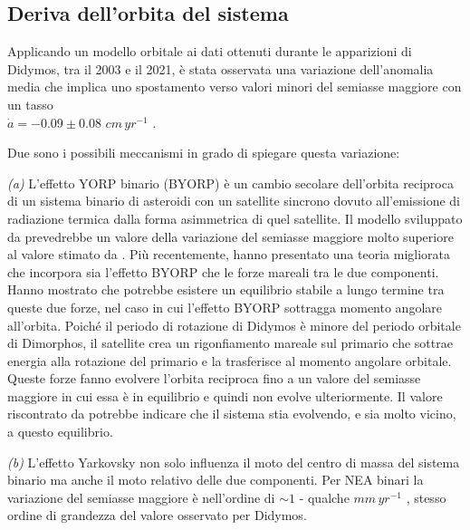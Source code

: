 \subsection{Deriva dell'orbita del sistema}
Applicando un modello orbitale ai dati ottenuti durante le apparizioni di Didymos, tra il 2003 e il 2021, è stata osservata una variazione dell'anomalia media che implica uno spostamento verso valori minori del semiasse maggiore con un tasso \\$\dot{a}=-0.09 \pm 0.08\,\,cm\,yr^{-1}$ \citep{scheirich_preimpact_2022}. 

Due sono i possibili meccanismi in grado di spiegare questa variazione:

\qquad \textit{(a)} L'effetto YORP binario (BYORP) è un cambio secolare dell'orbita reciproca di un sistema binario di asteroidi con un satellite sincrono dovuto all'emissione di radiazione termica dalla forma asimmetrica di quel satellite. Il modello sviluppato da \citet{pravec_binary_2010} prevedrebbe un valore della variazione del semiasse maggiore molto superiore al valore stimato da \citet{scheirich_preimpact_2022}. Più recentemente, \citet{jacobson_dynamics_2011} hanno presentato una teoria migliorata che incorpora sia l'effetto BYORP che le forze mareali tra le due componenti. Hanno mostrato che potrebbe esistere un equilibrio stabile a lungo termine tra queste due forze, nel caso in cui l'effetto BYORP sottragga momento angolare all'orbita. Poiché il periodo di rotazione di Didymos è minore del periodo orbitale di Dimorphos, il satellite crea un rigonfiamento mareale sul primario che sottrae energia alla rotazione del primario e la trasferisce al momento angolare orbitale. Queste forze fanno evolvere l'orbita reciproca fino a un valore del semiasse maggiore in cui essa è in equilibrio e quindi non evolve ulteriormente. Il valore riscontrato da \citet{scheirich_preimpact_2022} potrebbe indicare che il sistema stia evolvendo, e sia molto vicino, a questo equilibrio.

\qquad \textit{(b)} L'effetto Yarkovsky non solo influenza il moto del centro di massa del sistema binario ma anche il moto relativo delle due componenti. Per NEA binari la variazione del semiasse maggiore è nell'ordine di $\sim 1$ - qualche $mm\,yr^{-1}$ \citep{scheirich_satellite_2021}, stesso ordine di grandezza del valore osservato per Didymos.

